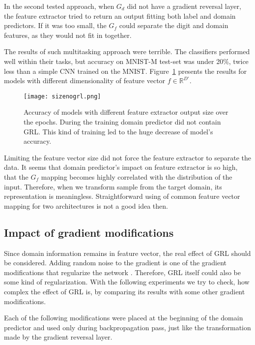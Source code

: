 \documentclass{article}
\begin{document}
\par
In the second tested approach, when $G_{d}$ did not have a gradient reversal layer, the feature extractor tried to return an output fitting both label and domain predictors. If it was too small, the $G_{f}$ could separate the digit and domain features, as they would not fit in together.
\par
The results of such multitasking approach were terrible. The classifiers performed well within their tasks, but accuracy on MNIST-M test-set was under 20\%, twice less than a simple CNN trained on the MNIST. Figure~\ref{fig:size_nogrl} presents the results for models with different dimensionality of feature vector $f \in \mathbb{R}^{D'}$.
\begin{figure}[htb]%
    \centering
    \texttt{[image: sizenogrl.png]}%
    \caption{Accuracy of models with different feature extractor output size over the epochs. During the training domain predictor did not contain GRL. This kind of training led to the huge decrease of model's accuracy.}
    \label{fig:size_nogrl}%
\end{figure}
\par
Limiting the feature vector size did not force the feature extractor to separate the data. It seems that domain predictor's impact on feature extractor is so high, that the $G_{f}$ mapping becomes highly correlated with the distribution of the input. Therefore, when we transform sample from the target domain, its representation is meaningless. Straightforward using of common feature vector mapping for two architectures is not a good idea then.

\subsection{Impact of gradient modifications}
Since domain information remains in feature vector, the real effect of GRL should be considered. Adding random noise to the gradient is one of the gradient modifications that regularize the network \cite{noise}. Therefore, GRL itself could also be some kind of regularization. With the following experiments we try to check, how complex the effect of GRL is, by comparing its results with some other gradient modifications.
\par
Each of the following modifications were placed at the beginning of the domain predictor and used only during backpropagation pass, just like the transformation made by the gradient reversal layer. 
\end{document}
